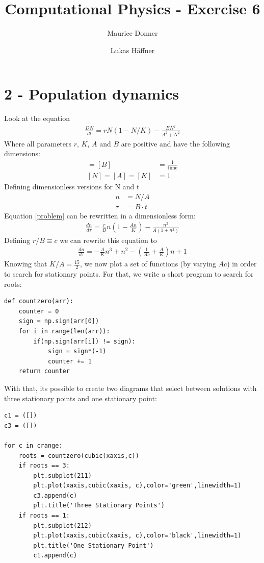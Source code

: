 \documentclass{article}
\title{Computational Physics - Exercise 6}
\author{Maurice Donner \and Lukas Häffner}
\begin{document}
\maketitle
\newpage

\section*{2 - Population dynamics}

Look at the equation
\begin{align}
    \frac{DN}{dt} = rN(1-N/K)- \frac{BN^2}{A^2 +N^2}
    \label{problem}
\end{align}
Where all parameters $r$, $K$, $A$ and $B$ are positive and have the
following dimensions:
\begin{align}
    [r] = [B] &= \frac{1}{\text{time}} \\[0.3cm]
    [N] = [A] = [K] &= 1
\end{align}
Defining dimensionless versions for N and t
\begin{align}
    n &= N/A \\
    \tau &= B \cdot t
\end{align}
Equation \ref{problem} can be rewritten in a dimensionless form:
\begin{align}
    \frac{dn}{d\tau} = \frac{r}{B} n \left( 1 - \frac{An}{K} \right) -
    \frac{n^2}{A(1+n^2)} 
\end{align}
Defining \( r/B \equiv c \) we can rewrite this equation to
\begin{align}
    \frac{dn}{d \tau} = - \frac{A}{K} n^3 + n^2 - \left( \frac{1}{Ac} +
	\frac{A}{K} \right) n + 1
\end{align}
Knowing that \( K/A = \frac{15}{2} \), we now plot a set of functions
(by varying \( Ac \)) in order to search for stationary points. For that,
we write a short program to search for roots:

\begin{lstlisting}
def countzero(arr):
    counter = 0
    sign = np.sign(arr[0])
    for i in range(len(arr)):
        if(np.sign(arr[i]) != sign):
            sign = sign*(-1)
            counter += 1
    return counter
\end{lstlisting}

With that, its possible to create two diagrams that select between solutions
with three stationary points and one stationary point:

\begin{lstlisting}
c1 = ([])
c3 = ([])

for c in crange:
    roots = countzero(cubic(xaxis,c))
    if roots == 3:
        plt.subplot(211)
        plt.plot(xaxis,cubic(xaxis, c),color='green',linewidth=1)
        c3.append(c)
        plt.title('Three Stationary Points')
    if roots == 1:
        plt.subplot(212)
        plt.plot(xaxis,cubic(xaxis, c),color='black',linewidth=1)
        plt.title('One Stationary Point')
        c1.append(c)
\end{lstlisting}
\end{document}

